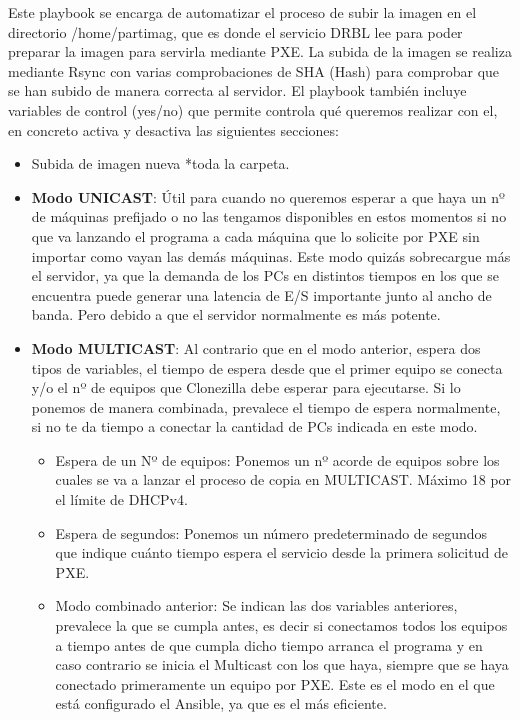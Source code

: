 Este playbook se encarga de automatizar el proceso de subir la imagen en el directorio /home/partimag, que es donde el servicio DRBL lee para poder preparar la imagen para servirla
mediante PXE. La subida de la imagen se realiza mediante Rsync con varias comprobaciones de SHA (Hash) para comprobar que se han subido de manera correcta al servidor.
\vspace{5mm}
El playbook también incluye variables de control (yes/no) que permite controla qué queremos realizar con el, en concreto activa y desactiva las siguientes secciones:

\begin{itemize}
	\item Subida de imagen nueva *toda la carpeta.
	\item \textbf{Modo UNICAST}: Útil para cuando no queremos esperar a que haya un nº de máquinas prefijado o no las tengamos disponibles en estos momentos si no que va lanzando el programa 
	a cada máquina que lo solicite por PXE sin importar como vayan las demás máquinas. Este modo quizás sobrecargue más el servidor, ya que la demanda de los PCs en distintos tiempos en los que se encuentra
	puede generar una latencia de E/S importante junto al ancho de banda. Pero debido a que el servidor normalmente es más potente.
	\item \textbf{Modo MULTICAST}: Al contrario que en el modo anterior, espera dos tipos de variables, el tiempo de espera desde que el primer equipo se conecta y/o el nº de equipos
	que Clonezilla debe esperar para ejecutarse. Si lo ponemos de manera combinada, prevalece el tiempo de espera normalmente, si no te da tiempo a conectar la cantidad de PCs indicada 
	en este modo.
	\begin{itemize}
		\item Espera de un Nº de equipos: Ponemos un nº acorde de equipos sobre los cuales se va a lanzar el proceso de copia en MULTICAST. Máximo 18 por el límite de DHCPv4.
		\item Espera de segundos: Ponemos un número predeterminado de segundos que indique cuánto tiempo espera el servicio desde la primera solicitud de PXE.
		\item Modo combinado anterior: Se indican las dos variables anteriores, prevalece la que se cumpla antes, es decir si conectamos todos los equipos a tiempo antes de que cumpla dicho tiempo arranca el programa y en caso contrario se inicia el Multicast con los que haya, 
		siempre que se haya conectado primeramente un equipo por PXE. Este es el modo en el que está configurado el Ansible, ya que es el más eficiente.
	\end{itemize}
\end{itemize}

